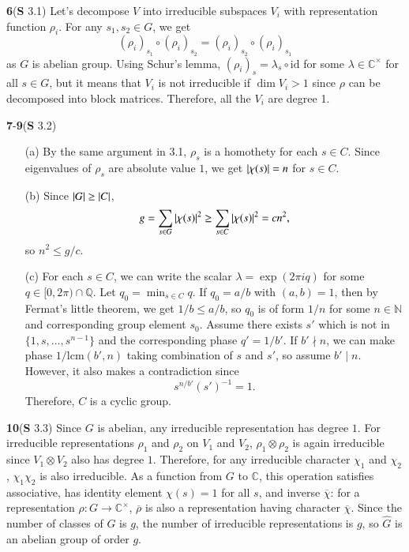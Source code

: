 \documentclass[a4paper, 12pt]{article}
\theoremstyle{Mydefinition}
\theoremstyle{Mytheorem}
\begin{document}
\noindent \textbf{6}(\textbf{S} 3.1)
Let's decompose $V$ into irreducible subspaces $V_i$ with representation function $\rho_i$. For any $s_1,s_2\in G$, we get
\begin{equation}
    \left(\rho_i\right)_{s_1}\circ \left(\rho_i\right)_{s_2} = \left(\rho_i\right)_{s_2}\circ \left(\rho_i\right)_{s_1}
\end{equation}
as $G$ is abelian group. Using Schur's lemma, $\left(\rho_i\right)_{s} = \lambda_s\circ \mathrm{id}$ for some $\lambda\in \mathbb{C}^\times$ for all $s\in G$, but it means that $V_i$ is not irreducible if $\dim V_i>1$ since $\rho$ can be decomposed into block matrices. Therefore, all the $V_i$ are degree 1.

\noindent \textbf{7}-\textbf{9}(\textbf{S} 3.2)
\begin{enumerate}
    \item[(a)] By the same argument in 3.1, $\rho_s$ is a homothety for each $s\in C$. Since eigenvalues of $\rho_s$ are absolute value $1$, we get $\abs{\chi(s)} = n$ for $s\in C$.
    \item[(b)] Since $\abs{G}\geq \abs{C}$,
    \begin{equation}
        g = \sum_{s\in G}\abs{\chi(s)}^2\geq \sum_{s\in C}\abs{\chi(s)}^2 = cn^2,
    \end{equation}
    so $n^2\leq g/c$.
    \item[(c)] For each $s\in C$, we can write the scalar $\lambda = \exp(2\pi i q)$ for some $q\in [0,2\pi)\cap \mathbb{Q}$. Let $q_0 = \min_{s\in C}q$. If $q_0=a/b$ with $(a,b)=1$, then by Fermat's little theorem, we get $1/b\leq a/b$, so $q_0$ is of form $1/n$ for some $n\in\mathbb{N}$ and corresponding group element $s_0$. Assume there exists $s'$ which is not in $\{1, s, \ldots, s^{n-1}\}$ and the corresponding phase $q'=1/b'$. If $b'\nmid n$, we can make phase $1/\mathrm{lcm}(b', n)$ taking combination of $s$ and $s'$, so assume $b'\mid n$. However, it also makes a contradiction since
    \begin{equation}
        s^{n/b'}(s')^{-1} = 1.
    \end{equation}
    Therefore, $C$ is a cyclic group.
\end{enumerate}
    
\noindent \textbf{10}(\textbf{S} 3.3)
Since $G$ is abelian, any irreducible representation has degree $1$. For irreducible representations $\rho_1$ and $\rho_2$ on $V_1$ and $V_2$, $\rho_1\otimes \rho_2$ is again irreducible since $V_1\otimes V_2$ also has degree $1$. Therefore, for any irreducible character $\chi_1$ and $\chi_2$, $\chi_1\chi_2$ is also irreducible. As a function from $G$ to $\mathbb{C}$, this operation satisfies associative, has identity element $\chi(s) = 1$ for all $s$, and inverse $\overline{\chi}$: for a representation $\rho:G\rightarrow \mathbb{C}^\times$, $\overline{\rho}$ is also a representation having character $\overline{\chi}$. Since the number of classes of $G$ is $g$, the number of irreducible representations is $g$, so $\hat{G}$ is an abelian group of order $g$.
\end{document}

